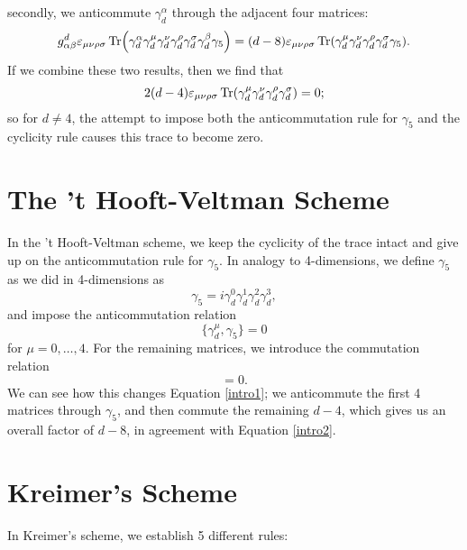 \documentclass[12pt]{article}
\numberwithin{equation}{section}
\numberwithin{figure}{section}
\numberwithin{table}{section}
\begin{document}
        secondly, we anticommute \(\gamma_d^\alpha\) through the adjacent four matrices: 
	\begin{equation}
	g_{\alpha\beta}^d\varepsilon_{\mu\nu\rho\sigma}\Tr(\gamma_d^\alpha\gamma_d^\mu\gamma_d^\nu\gamma_d^\rho\gamma_d^\sigma\gamma_d^\beta\gamma_5)=(d-8)\varepsilon_{\mu\nu\rho\sigma}\Tr(\gamma_d^\mu\gamma_d^\nu\gamma_d^\rho\gamma_d^\sigma\gamma_5).  \label{intro2}
	\end{equation}
        If we combine these two results, then we find that 
	\begin{equation}
	2(d-4)\varepsilon_{\mu\nu\rho\sigma}\Tr(\gamma_d^\mu\gamma_d^\nu\gamma_d^\rho\gamma_d^\sigma)=0;
	\end{equation}
        so for \(d\neq 4\), the attempt to impose both the anticommutation rule for \(\gamma_5\) and the cyclicity rule causes this trace to become zero.

        \section{The 't Hooft-Veltman Scheme}

        In the 't Hooft-Veltman scheme, we keep the cyclicity of the trace intact and give up on the anticommutation rule for \(\gamma_5\). In analogy to 4-dimensions, we define \(\gamma_5\) as we did in 4-dimensions as 
	\begin{equation}
	\gamma_5=i\gamma_d^0\gamma_d^1\gamma_d^2\gamma_d^3,
	\end{equation}
        and impose the anticommutation relation 
	\begin{equation}
	\{\gamma_d^\mu,\gamma_5\}=0
	\end{equation}
        for \(\mu=0,\dots,4\). For the remaining matrices, we introduce the commutation relation 
	\begin{equation}
	[\gamma_d^\mu,\gamma_5]=0.
	\end{equation}
        We can see how this changes Equation \ref{intro1}; we anticommute the first 4 matrices through \(\gamma_5\), and then commute the remaining \(d-4\), which gives us an overall factor of \(d-8\), in agreement with Equation \ref{intro2}.

        \section{Kreimer's Scheme}

        In Kreimer's scheme, we establish 5 different rules:
\end{document}
